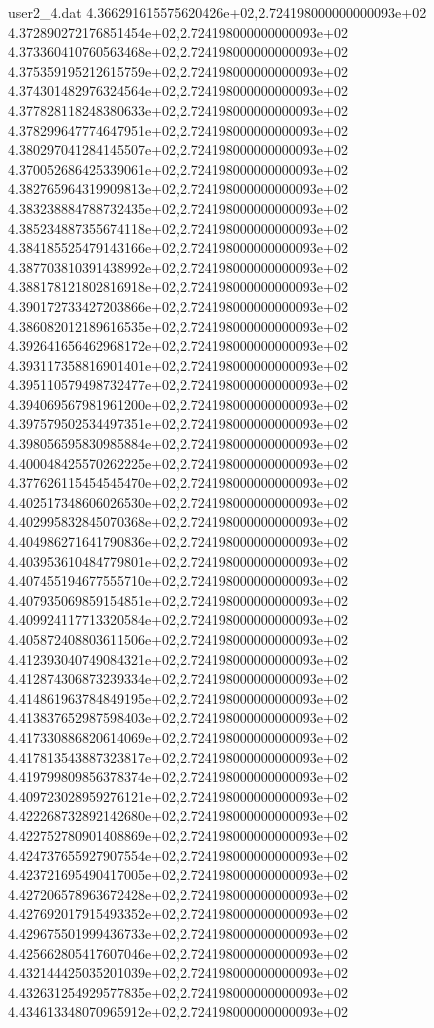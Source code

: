 \begin{filecontents}{user2_4.dat}
4.366291615575620426e+02,2.724198000000000093e+02
4.372890272176851454e+02,2.724198000000000093e+02
4.373360410760563468e+02,2.724198000000000093e+02
4.375359195212615759e+02,2.724198000000000093e+02
4.374301482976324564e+02,2.724198000000000093e+02
4.377828118248380633e+02,2.724198000000000093e+02
4.378299647774647951e+02,2.724198000000000093e+02
4.380297041284145507e+02,2.724198000000000093e+02
4.370052686425339061e+02,2.724198000000000093e+02
4.382765964319909813e+02,2.724198000000000093e+02
4.383238884788732435e+02,2.724198000000000093e+02
4.385234887355674118e+02,2.724198000000000093e+02
4.384185525479143166e+02,2.724198000000000093e+02
4.387703810391438992e+02,2.724198000000000093e+02
4.388178121802816918e+02,2.724198000000000093e+02
4.390172733427203866e+02,2.724198000000000093e+02
4.386082012189616535e+02,2.724198000000000093e+02
4.392641656462968172e+02,2.724198000000000093e+02
4.393117358816901401e+02,2.724198000000000093e+02
4.395110579498732477e+02,2.724198000000000093e+02
4.394069567981961200e+02,2.724198000000000093e+02
4.397579502534497351e+02,2.724198000000000093e+02
4.398056595830985884e+02,2.724198000000000093e+02
4.400048425570262225e+02,2.724198000000000093e+02
4.377626115454545470e+02,2.724198000000000093e+02
4.402517348606026530e+02,2.724198000000000093e+02
4.402995832845070368e+02,2.724198000000000093e+02
4.404986271641790836e+02,2.724198000000000093e+02
4.403953610484779801e+02,2.724198000000000093e+02
4.407455194677555710e+02,2.724198000000000093e+02
4.407935069859154851e+02,2.724198000000000093e+02
4.409924117713320584e+02,2.724198000000000093e+02
4.405872408803611506e+02,2.724198000000000093e+02
4.412393040749084321e+02,2.724198000000000093e+02
4.412874306873239334e+02,2.724198000000000093e+02
4.414861963784849195e+02,2.724198000000000093e+02
4.413837652987598403e+02,2.724198000000000093e+02
4.417330886820614069e+02,2.724198000000000093e+02
4.417813543887323817e+02,2.724198000000000093e+02
4.419799809856378374e+02,2.724198000000000093e+02
4.409723028959276121e+02,2.724198000000000093e+02
4.422268732892142680e+02,2.724198000000000093e+02
4.422752780901408869e+02,2.724198000000000093e+02
4.424737655927907554e+02,2.724198000000000093e+02
4.423721695490417005e+02,2.724198000000000093e+02
4.427206578963672428e+02,2.724198000000000093e+02
4.427692017915493352e+02,2.724198000000000093e+02
4.429675501999436733e+02,2.724198000000000093e+02
4.425662805417607046e+02,2.724198000000000093e+02
4.432144425035201039e+02,2.724198000000000093e+02
4.432631254929577835e+02,2.724198000000000093e+02
4.434613348070965912e+02,2.724198000000000093e+02

\end{filecontents}
